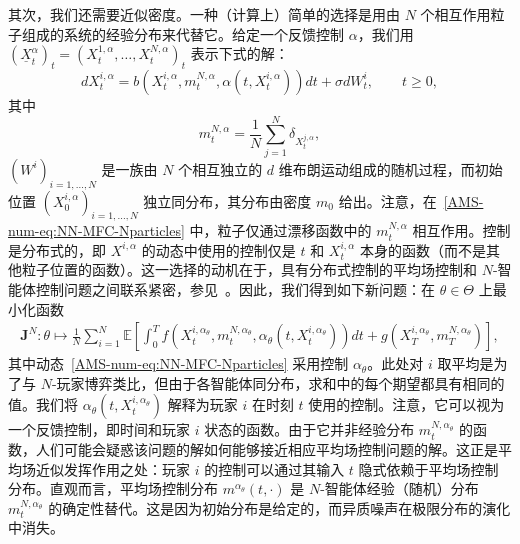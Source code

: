\documentclass{amsproc}
\theoremstyle{definition}
\theoremstyle{remark}
\numberwithin{equation}{section}
\newcommand{\EE}{{\mathbb E}}
\newcommand{\bJ}{{\mathbf J}}
\newcommand{\ctrl}{\alpha}
\begin{document}
其次，我们还需要近似密度。一种（计算上）简单的选择是用由 $N$ 个相互作用粒子组成的系统的经验分布来代替它。给定一个反馈控制 $\ctrl$，我们用 $(\underline X_t^{\ctrl})_{t} = (X_t^{1, \ctrl}, \dots, X_t^{N, \ctrl})_{t}$ 表示下式的解：
\begin{equation}
\label{AMS-num-eq:NN-MFC-Nparticles}
	d X_t^{i, \ctrl} = b(X_t^{i, \ctrl}, m^{N, \ctrl}_t, \ctrl(t, X_t^{i, \ctrl})) dt + \sigma d W^i_t, \qquad t \ge 0,
\end{equation}
其中
$$
	m^{N, \ctrl}_t = \frac{1}{N} \sum_{j=1}^N \delta_{X_t^{j, \ctrl}}, 
$$ 
$(W^i)_{i=1,\dots,N}$ 是一族由 $N$ 个相互独立的 $d$ 维布朗运动组成的随机过程，而初始位置 $(X_0^{i, \ctrl})_{i=1,\dots,N}$ 独立同分布，其分布由密度 $m_0$ 给出。注意，在~\eqref{AMS-num-eq:NN-MFC-Nparticles} 中，粒子仅通过漂移函数中的 $m^{N, \ctrl}_t$ 相互作用。控制是分布式的，即 $X^{i, \ctrl}$ 的动态中使用的控制仅是 $t$ 和 $X_t^{i, \ctrl}$ 本身的函数（而不是其他粒子位置的函数）。这一选择的动机在于，具有分布式控制的平均场控制和 $N$-智能体控制问题之间联系紧密，参见~\cite{MR3753660}。因此，我们得到如下新问题：在 $\theta \in \Theta$ 上最小化函数
\begin{align*}
	\bJ^{N}: \theta \mapsto \frac{1}{N} \sum_{i=1}^N \EE \left[\int_0^T f(X_t^{i, \ctrl_\theta}, m^{N, \ctrl_\theta}_t, \ctrl_\theta(t,X_t^{i, \ctrl_\theta}) ) dt + g(X_T^{i, \ctrl_\theta}, m^{N,\ctrl_\theta}_T) \right],
\end{align*}
其中动态~\eqref{AMS-num-eq:NN-MFC-Nparticles} 采用控制 $\ctrl_\theta$。此处对 $i$ 取平均是为了与 $N$-玩家博弈类比，但由于各智能体同分布，求和中的每个期望都具有相同的值。我们将 $\ctrl_\theta(t,X_t^{i, \ctrl_\theta})$ 解释为玩家 $i$ 在时刻 $t$ 使用的控制。注意，它可以视为一个反馈控制，即时间和玩家 $i$ 状态的函数。由于它并非经验分布 $m^{N, \ctrl_\theta}_t$ 的函数，人们可能会疑惑该问题的解如何能够接近相应平均场控制问题的解。这正是平均场近似发挥作用之处：玩家 $i$ 的控制可以通过其输入 $t$ 隐式依赖于平均场控制分布。直观而言，平均场控制分布 $m^{\ctrl_\theta}(t,\cdot)$ 是 $N$-智能体经验（随机）分布 $m^{N, \ctrl_\theta}_t$ 的确定性替代。这是因为初始分布是给定的，而异质噪声在极限分布的演化中消失。   
\end{document}
